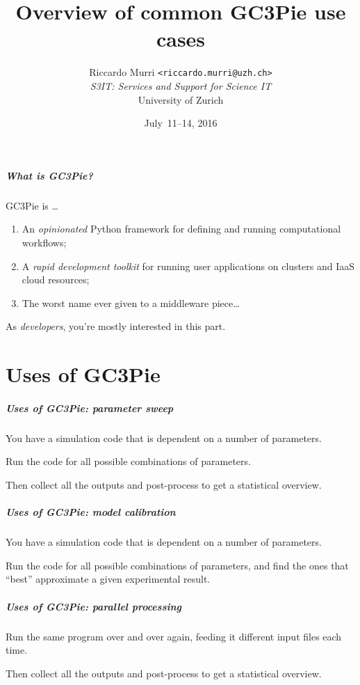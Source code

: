 \documentclass[english,serif,mathserif,xcolor=pdftex,dvipsnames,table]{beamer}
\title[Introduction]{%
  Overview of common GC3Pie use cases
}
\author[R. Murri, S3IT UZH]{%
  Riccardo Murri \texttt{<riccardo.murri@uzh.ch>}
  \\[1ex]
  \emph{S3IT: Services and Support for Science IT}
  \\[1ex]
  University of Zurich
}
\date{July~11--14, 2016}
\begin{document}
\maketitle

\begin{frame}
  \frametitle{What is GC3Pie?}
  GC3Pie is \ldots
  \begin{enumerate}
  \item \alert<1>{An \emph{opinionated} Python framework for defining and running computational workflows;}
  \item A \emph{rapid development toolkit} for running user applications on clusters and IaaS cloud resources;
  \item The worst name ever given to a middleware piece\ldots
  \end{enumerate}

  \+
  As \emph{developers}, \alert<1>{you're mostly interested in this part.}
\end{frame}


\part{Uses of GC3Pie}

\begin{frame}[fragile]
  \frametitle{Uses of GC3Pie: parameter sweep}

  You have a simulation code that is dependent on a number of parameters.

  \+
  Run the code for all possible combinations of parameters.

  \+
  Then collect all the outputs and post-process to get a
  statistical overview.
\end{frame}


\begin{frame}[fragile]
  \frametitle{Uses of GC3Pie: model calibration}

  You have a simulation code that is dependent on a number of parameters.

  \+
  Run the code for all possible combinations of parameters, and
  find the ones that ``best'' approximate a given experimental result.
\end{frame}


\begin{frame}[fragile]
  \frametitle{Uses of GC3Pie: parallel processing}

  Run the same program over and over again,
  feeding it different input files each time.

  \+
  Then collect all the outputs and post-process to get a
  statistical overview.
\end{frame}
\end{document}

